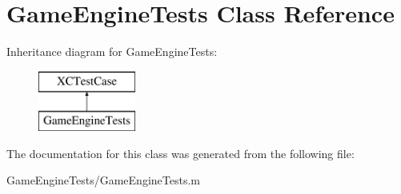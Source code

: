 \hypertarget{interface_game_engine_tests}{}\section{Game\+Engine\+Tests Class Reference}
\label{interface_game_engine_tests}
Inheritance diagram for Game\+Engine\+Tests\+:\begin{figure}[H]
\begin{center}
\leavevmode
\includegraphics[height=2.000000cm]{interface_game_engine_tests}
\end{center}
\end{figure}


The documentation for this class was generated from the following file\+:\begin{DoxyCompactItemize}
\item 
Game\+Engine\+Tests/Game\+Engine\+Tests.\+m\end{DoxyCompactItemize}
